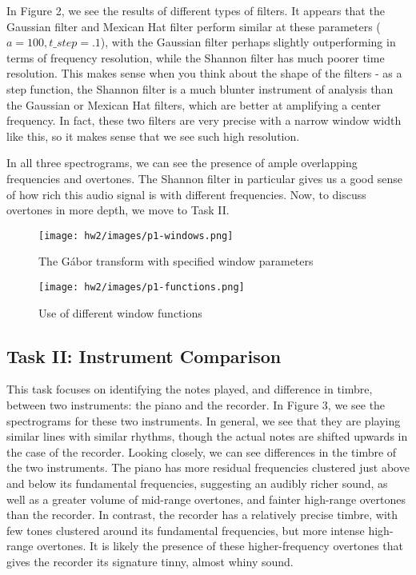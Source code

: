 \documentclass[a4paper,10 pt]{article}
\begin{document}
In Figure 2, we see the results of different types of filters. It appears that the Gaussian filter and Mexican Hat filter perform similar at these parameters ($a=100, t\_step=.1$), with the Gaussian filter perhaps slightly outperforming in terms of frequency resolution, while the Shannon filter has much poorer time resolution. This makes sense when you think about the shape of the filters - as a step function, the Shannon filter is a much blunter instrument of analysis than the Gaussian or Mexican Hat filters, which are better at amplifying a center frequency. In fact, these two filters are very precise with a narrow window width like this, so it makes sense that we see such high resolution.

In all three spectrograms, we can see the presence of ample overlapping frequencies and overtones. The Shannon filter in particular gives us a good sense of how rich this audio signal is with different frequencies. Now, to discuss overtones in more depth, we move to Task II.
\begin{figure}[H]
  \centering
    \texttt{[image: hw2/images/p1-windows.png]}
    \label{fig:windows1}
    \caption{The G\'abor transform with specified window parameters}
\end{figure}

\begin{figure}[H]
  \centering
    \texttt{[image: hw2/images/p1-functions.png]}
    \label{fig:functions1}
    \caption{Use of different window functions}
\end{figure}
\subsection{Task II: Instrument Comparison}
This task focuses on identifying the notes played, and difference in timbre, between two instruments: the piano and the recorder. In Figure 3, we see the spectrograms for these two instruments. In general, we see that they are playing similar lines with similar rhythms, though the actual notes are shifted upwards in the case of the recorder. Looking closely, we can see differences in the timbre of the two instruments. The piano has more residual frequencies clustered just above and below its fundamental frequencies, suggesting an audibly richer sound, as well as a greater volume of mid-range overtones, and fainter high-range overtones than the recorder. In contrast, the recorder has a relatively precise timbre, with few tones clustered around its fundamental frequencies, but more intense high-range overtones. It is likely the presence of these higher-frequency overtones that gives the recorder its signature tinny, almost whiny sound.
\end{document}
